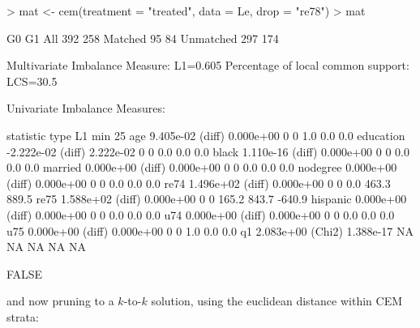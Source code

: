 \documentclass[article]{jss}
\begin{document}
\begin{Schunk}
\begin{Sinput}
> mat <- cem(treatment = "treated", data = Le, drop = "re78")
> mat
\end{Sinput}
\begin{Soutput}
           G0  G1
All       392 258
Matched    95  84
Unmatched 297 174


Multivariate Imbalance Measure: L1=0.605
Percentage of local common support: LCS=30.5%

Univariate Imbalance Measures:

           statistic   type        L1 min 25%
age        9.405e-02 (diff) 0.000e+00   0   0   1.0   0.0    0.0
education -2.222e-02 (diff) 2.222e-02   0   0   0.0   0.0    0.0
black      1.110e-16 (diff) 0.000e+00   0   0   0.0   0.0    0.0
married    0.000e+00 (diff) 0.000e+00   0   0   0.0   0.0    0.0
nodegree   0.000e+00 (diff) 0.000e+00   0   0   0.0   0.0    0.0
re74       1.496e+02 (diff) 0.000e+00   0   0   0.0 463.3  889.5
re75       1.588e+02 (diff) 0.000e+00   0   0 165.2 843.7 -640.9
hispanic   0.000e+00 (diff) 0.000e+00   0   0   0.0   0.0    0.0
u74        0.000e+00 (diff) 0.000e+00   0   0   0.0   0.0    0.0
u75        0.000e+00 (diff) 0.000e+00   0   0   1.0   0.0    0.0
q1         2.083e+00 (Chi2) 1.388e-17  NA  NA    NA    NA     NA
\end{Soutput}
\begin{Soutput}
[1] FALSE
\end{Soutput}
\end{Schunk}
and now pruning to a $k$-to-$k$ solution, using the euclidean distance
within CEM strata:
\end{document}
